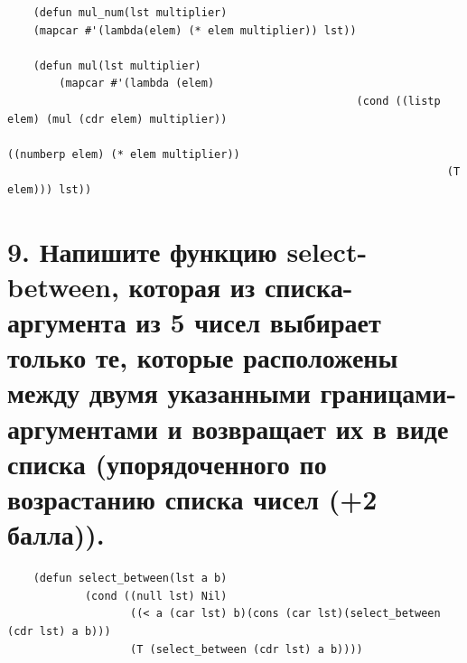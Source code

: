 \documentclass[12pt]{report}
\begin{document}
\begin{lstlisting}
	(defun mul_num(lst multiplier)
	(mapcar #'(lambda(elem) (* elem multiplier)) lst))
	
	(defun mul(lst multiplier)
		(mapcar #'(lambda (elem)
													  (cond ((listp elem) (mul (cdr elem) multiplier))
																	((numberp elem) (* elem multiplier))
																	(T elem))) lst))
\end{lstlisting}

\section*{9. Напишите функцию select-between, которая из списка-аргумента из 5 чисел выбирает только те, которые расположены между двумя указанными границами-аргументами и возвращает их в виде списка (упорядоченного по возрастанию списка чисел (+2 балла)).}

\begin{lstlisting}
	(defun select_between(lst a b)
			(cond ((null lst) Nil)
				   ((< a (car lst) b)(cons (car lst)(select_between (cdr lst) a b)))
				   (T (select_between (cdr lst) a b))))
\end{lstlisting}
\end{document}
